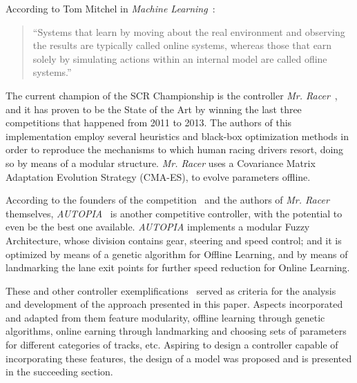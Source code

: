 	According to Tom Mitchel in \emph{Machine Learning}~\cite{Mitcchel:ML}:

	\begin{quotation} \itshape

		``Systems that learn by moving about the real environment and observing the results are typically called online systems, whereas those that earn solely by simulating actions within an internal model are called ofline systems.''
	
	\end{quotation}

	The current champion of the SCR Championship is the controller \emph{Mr. Racer}~\cite{MrRacer}, and it has proven to be the State of the Art by winning the last three competitions that happened from 2011 to 2013. The authors of this implementation employ several heuristics and black-box optimization methods in order to reproduce the mechanisms to which human racing drivers resort, doing so by means of a modular structure. \emph{Mr. Racer} uses a Covariance Matrix Adaptation Evolution Strategy (CMA-ES), to evolve parameters offline.
	
	According to the founders of the competition~\cite{SCRC} and the authors of \emph{Mr. Racer} themselves, \emph{AUTOPIA}~\cite{AUTOPIA} is another competitive controller, with the potential to even be the best one available. \emph{AUTOPIA} implements a modular Fuzzy Architecture, whose division contains gear, steering and speed control; and it is optimized by means of a genetic algorithm for Offline Learning, and by means of landmarking the lane exit points for further speed reduction for Online Learning.
	
	These and other controller exemplifications~\cite{SCRC} served as criteria for the analysis and development of the approach presented in this paper. Aspects incorporated and adapted from them feature modularity, offline learning through genetic algorithms, online earning through landmarking and choosing sets of parameters for different categories of tracks, etc. Aspiring to design a controller capable of incorporating these features, the design of a model was proposed and is presented in the succeeding section.
	
